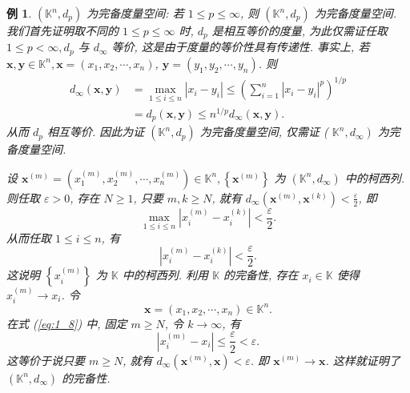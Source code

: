 \documentclass[openany]{ctexbook}
\theoremstyle{kaiti}
\theoremstyle{normal}
\newtheorem{example}{例}[section]
\begin{document}
\begin{example}
$\left(\mathbb{K}^n, d_{p}\right)$ 为完备度量空间: 若 $1 \leqslant p \leqslant \infty$, 则 $\left(\mathbb{K}^n, d_{p}\right)$ 为完备度量空间. 我们首先证明取不同的 $1 \leqslant p \leqslant \infty$ 时, $d_{p}$ 是相互等价的度量, 为此仅需证任取 $1 \leqslant p<\infty, d_{p}$ 与 $d_{\infty}$ 等价, 这是由于度量的等价性具有传递性. 事实上, 若 $\boldsymbol{x}, \boldsymbol{y} \in \mathbb{K}^n, \boldsymbol{x}=\left(x_1, x_2, \cdots, x_n\right)$, $\boldsymbol{y}=\left(y_1, y_2, \cdots, y_n\right)$. 则
$$
\begin{aligned}
d_{\infty}(\boldsymbol{x}, \boldsymbol{y}) &=\max_{1 \leqslant i \leqslant n}\left|x_{i}-y_{i}\right| \leqslant\left(\sum_{i=1}^n\left|x_{i}-y_{i}\right|^{p}\right)^{1 / p} \\
&=d_{p}(\boldsymbol{x}, \boldsymbol{y}) \leqslant n^{1 / p} d_{\infty}(\boldsymbol{x}, \boldsymbol{y}).
\end{aligned}
$$
从而 $d_{p}$ 相互等价. 因此为证 $\left(\mathbb{K}^n, d_{p}\right)$ 为完备度量空间, 仅需证 ( $\left.\mathbb{K}^n, d_{\infty}\right)$ 为完备度量空间. 

设 $\boldsymbol{x}^{(m)}=\left(x_1^{(m)}, x_2^{(m)}, \cdots, x_n^{(m)}\right) \in \mathbb{K}^n,\left\{\boldsymbol{x}^{(m)}\right\}$ 为 $\left(\mathbb{K}^n, d_{\infty}\right)$ 中的柯西列. 则任取 $\varepsilon>0$, 存在 $N \geqslant 1$, 只要 $m, k \geqslant N$, 就有 $d_{\infty}\left(\boldsymbol{x}^{(m)}, \boldsymbol{x}^{(k)}\right)<\frac{\varepsilon}{2}$, 即
$$
\max_{1 \leqslant i \leqslant n}\left|x_{i}^{(m)}-x_{i}^{(k)}\right|<\frac{\varepsilon}{2}.
$$
从而任取 $1 \leqslant i \leqslant n$, 有
\begin{equation}
  \label{eq:1_8}
  \left|x_{i}^{(m)}-x_{i}^{(k)}\right|<\frac{\varepsilon}{2}.
\end{equation}
这说明 $\left\{x_{i}^{(m)}\right\}$ 为 $\mathbb{K}$ 中的柯西列. 利用 $\mathbb{K}$ 的完备性, 存在 $x_{i} \in \mathbb{K}$ 使得 $x_{i}^{(m)} \rightarrow x_{i}$. 令
$$
\boldsymbol{x}=\left(x_1, x_2, \cdots, x_n\right) \in \mathbb{K}^n.
$$
在式 (\ref{eq:1_8}) 中, 固定 $m \geqslant N$, 令 $k \rightarrow \infty$, 有
$$
\left|x_{i}^{(m)}-x_{i}\right| \leqslant \frac{\varepsilon}{2}<\varepsilon.
$$
这等价于说只要 $m \geqslant N$, 就有 $d_{\infty}\left(\boldsymbol{x}^{(m)}, \boldsymbol{x}\right)<\varepsilon$. 即 $\boldsymbol{x}^{(m)} \rightarrow \boldsymbol{x}$. 这样就证明了 $\left(\mathbb{K}^n, d_{\infty}\right)$ 的完备性.
\end{example}
\end{document}

